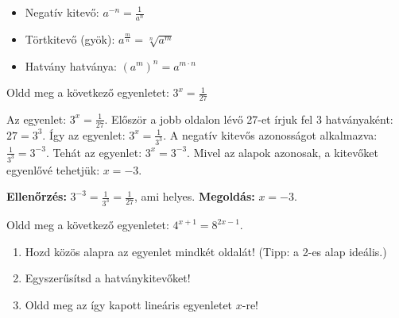 \documentclass[a4paper,12pt]{article}
\theoremstyle{definition} %
\begin{document}
\begin{definiciodoboz}
\begin{itemize}
    \item Negatív kitevő: $a^{-n} = \frac{1}{a^n}$
    \item Törtkitevő (gyök): $a^{\frac{m}{n}} = \sqrt[n]{a^m}$
    \item Hatvány hatványa: $(a^m)^n = a^{m \cdot n}$
\end{itemize}
\end{definiciodoboz}

\begin{feladatdoboz}
Oldd meg a következő egyenletet: $3^x = \frac{1}{27}$
\end{feladatdoboz}

\begin{megoldasdoboz}
Az egyenlet: $3^x = \frac{1}{27}$.
Először a jobb oldalon lévő 27-et írjuk fel 3 hatványaként: $27 = 3^3$.
Így az egyenlet: $3^x = \frac{1}{3^3}$.
A negatív kitevős azonosságot alkalmazva: $\frac{1}{3^3} = 3^{-3}$.
Tehát az egyenlet: $3^x = 3^{-3}$.
Mivel az alapok azonosak, a kitevőket egyenlővé tehetjük:
$x = -3$.

\textbf{Ellenőrzés:} $3^{-3} = \frac{1}{3^3} = \frac{1}{27}$, ami helyes.
\textbf{Megoldás:} $x=-3$.
\end{megoldasdoboz}

\begin{feladatdoboz}
Oldd meg a következő egyenletet: $4^{x+1} = 8^{2x-1}$.
\begin{enumerate}[label=(\alph*)]
    \item Hozd közös alapra az egyenlet mindkét oldalát! (Tipp: a 2-es alap ideális.)
    \item Egyszerűsítsd a hatványkitevőket!
    \item Oldd meg az így kapott lineáris egyenletet $x$-re!
\end{enumerate}
\end{feladatdoboz}
\end{document}
